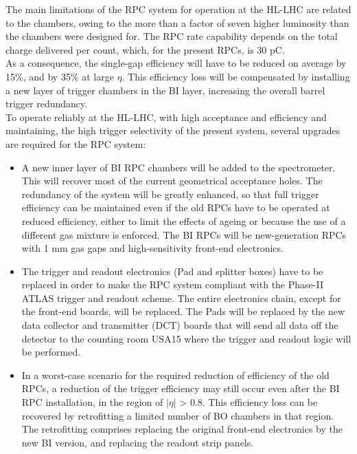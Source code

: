 \noindent The main limitations of the RPC system for operation at the HL-LHC are related to the
chambers, owing to the more than a factor of seven higher luminosity than the chambers
were designed for. The RPC rate capability depends on the total charge delivered per count,
which, for the present RPCs, is 30 pC.\\
As a consequence, the single-gap efficiency will have to be reduced on average by 15\%, and by
35\% at large $\eta$. This efficiency loss will be compensated by installing a new layer of trigger chambers in the BI layer, increasing the overall barrel trigger redundancy.\\
To operate reliably at the HL-LHC, with high acceptance and efficiency and maintaining, the high trigger selectivity of the present system, several upgrades are required for the RPC system:
\begin{itemize}
	\item A new inner layer of BI RPC chambers will be added to the spectrometer. This will
recover most of the current geometrical acceptance holes. The redundancy of the
system will be greatly enhanced, so that full trigger efficiency can be maintained even
if the old RPCs have to be operated at reduced efficiency, either to limit the effects of
ageing or because the use of a different gas mixture is enforced. The BI RPCs will be
new-generation RPCs with 1 mm gas gaps and high-sensitivity front-end electronics.
	\item The trigger and readout electronics (Pad and splitter boxes) have to be replaced in order
to make the RPC system compliant with the Phase-II ATLAS trigger and readout
scheme. The entire electronics chain, except for the front-end boards, will be replaced.
The Pads will be replaced by the new data collector and transmitter (DCT) boards that
will send all data off the detector to the counting room USA15 where the trigger and
readout logic will be performed.
	\item In a worst-case scenario for the required reduction of efficiency of the old RPCs, a
reduction of the trigger efficiency may still occur even after the BI RPC installation,
in the region of $|\eta|$ > 0.8. This efficiency loss can be recovered by retrofitting a limited
number of BO chambers in that region. The retrofitting comprises replacing the
original front-end electronics by the new BI version, and replacing the readout strip
panels.
\end{itemize}
\newpage

